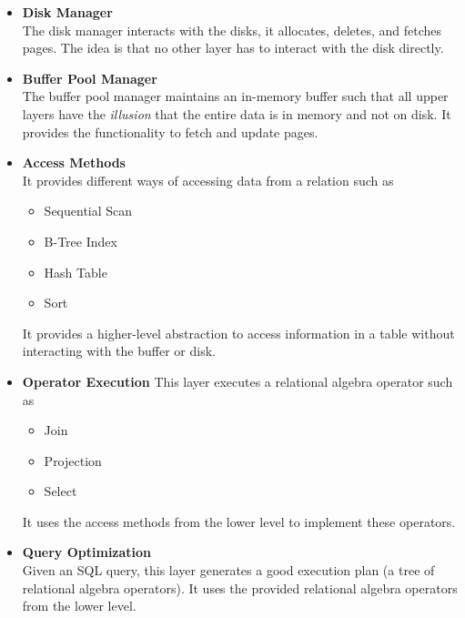\begin{itemize}
\item \textbf{Disk Manager}\\
The disk manager interacts with the disks, it allocates, deletes, and fetches pages. The idea is that no other layer has to interact with the disk directly.
\item \textbf{Buffer Pool Manager}\\
The buffer pool manager maintains an in-memory buffer such that all upper layers have the \textit{illusion} that the entire data is in memory and not on disk. It provides the functionality to fetch and update pages.
\item \textbf{Access Methods}\\
It provides different ways of accessing data from a relation such as \begin{itemize}
\item Sequential Scan
\item B-Tree Index
\item Hash Table
\item Sort
\end{itemize}
It provides a higher-level abstraction to access information in a table without interacting with the buffer or disk.
\item \textbf{Operator Execution}
This layer executes a relational algebra operator such as\begin{itemize}
\item Join
\item Projection
\item Select
\end{itemize}
It uses the access methods from the lower level to implement these operators.
\item \textbf{Query Optimization}\\
Given an SQL query, this layer generates a good execution plan (a tree of relational algebra operators). It uses the provided relational algebra operators from the lower level.
\end{itemize}

